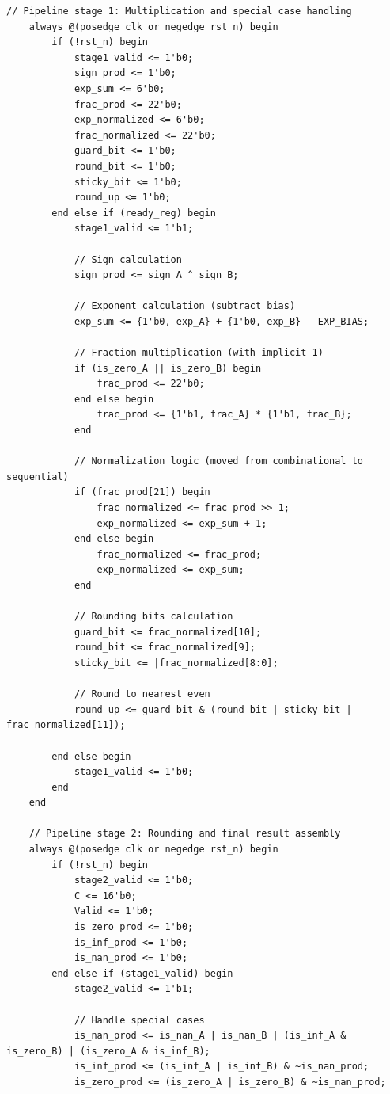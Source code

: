 \documentclass[UTF8]{ctexart}
\begin{document}
\begin{lstlisting}[frame=shadowbox]
    // Pipeline stage 1: Multiplication and special case handling
    always @(posedge clk or negedge rst_n) begin
        if (!rst_n) begin
            stage1_valid <= 1'b0;
            sign_prod <= 1'b0;
            exp_sum <= 6'b0;
            frac_prod <= 22'b0;
            exp_normalized <= 6'b0;
            frac_normalized <= 22'b0;
            guard_bit <= 1'b0;
            round_bit <= 1'b0;
            sticky_bit <= 1'b0;
            round_up <= 1'b0;
        end else if (ready_reg) begin
            stage1_valid <= 1'b1;
            
            // Sign calculation
            sign_prod <= sign_A ^ sign_B;
            
            // Exponent calculation (subtract bias)
            exp_sum <= {1'b0, exp_A} + {1'b0, exp_B} - EXP_BIAS;
            
            // Fraction multiplication (with implicit 1)
            if (is_zero_A || is_zero_B) begin
                frac_prod <= 22'b0;
            end else begin
                frac_prod <= {1'b1, frac_A} * {1'b1, frac_B};
            end
            
            // Normalization logic (moved from combinational to sequential)
            if (frac_prod[21]) begin
                frac_normalized <= frac_prod >> 1;
                exp_normalized <= exp_sum + 1;
            end else begin
                frac_normalized <= frac_prod;
                exp_normalized <= exp_sum;
            end
            
            // Rounding bits calculation
            guard_bit <= frac_normalized[10];
            round_bit <= frac_normalized[9];
            sticky_bit <= |frac_normalized[8:0];
            
            // Round to nearest even
            round_up <= guard_bit & (round_bit | sticky_bit | frac_normalized[11]);
            
        end else begin
            stage1_valid <= 1'b0;
        end
    end
    
    // Pipeline stage 2: Rounding and final result assembly
    always @(posedge clk or negedge rst_n) begin
        if (!rst_n) begin
            stage2_valid <= 1'b0;
            C <= 16'b0;
            Valid <= 1'b0;
            is_zero_prod <= 1'b0;
            is_inf_prod <= 1'b0;
            is_nan_prod <= 1'b0;
        end else if (stage1_valid) begin
            stage2_valid <= 1'b1;
            
            // Handle special cases
            is_nan_prod <= is_nan_A | is_nan_B | (is_inf_A & is_zero_B) | (is_zero_A & is_inf_B);
            is_inf_prod <= (is_inf_A | is_inf_B) & ~is_nan_prod;
            is_zero_prod <= (is_zero_A | is_zero_B) & ~is_nan_prod;
            

\end{lstlisting}
\end{document}
